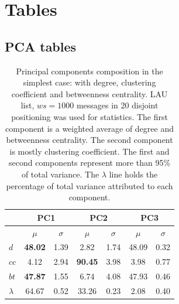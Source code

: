 \documentclass[%
 aip,
 jmp,%
 amsmath,amssymb,
 reprint,%
]{revtex4-1}
\begin{document}
\section{Tables}\label{sectables}
\clearpage
\subsection{PCA tables}\label{sec:pcat}

\begin{table}[H]
  \centering
  \caption{Principal components composition in the simplest case: with degree, clustering coefficient and betweenness centrality. LAU list, $ws=1000$ messages in 20 disjoint positioning was used for statistics. The first component is a weighted average of degree and betweenness centrality. The second component is mostly clustering coefficient. The first and second components represent more than 95\% of total variance. The $\lambda$ line holds the percentage of total variance attributed to each component.}
  \begin{tabular}{|l|c|c| c|c| c|c|}\hline
 & \multicolumn{2}{c|}{PC1}          & \multicolumn{2}{c|}{PC2} & \multicolumn{2}{c|}{PC3}  \\\hline
       & $\mu$            & $\sigma$ & $\mu$         & $\sigma$ & $\mu$ & $\sigma$  \\\hline
$d$       & {\bf 48.02}   & 1.39     & 2.82          & 1.74     & 48.09  & 0.32 \\
$cc$      & 4.12          & 2.94     & {\bf 90.45}   & 3.98     & 3.98  & 0.77 \\ 
$bt$      & {\bf 47.87}   & 1.55     & 6.74          & 4.08     & 47.93 & 0.46 \\ \hline
$\lambda$ & 64.67         & 0.52     & 33.26         & 0.23     & 2.08  & 0.40 \\ \hline
  \end{tabular}
  \label{compPCA0}
\end{table}
\end{document}
